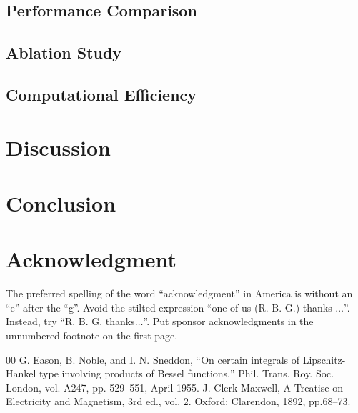 \documentclass[conference]{IEEEtran}
\begin{document}
\subsection{Performance Comparison}

\subsection{Ablation Study}

\subsection{Computational Efficiency}












\section{Discussion}










\section{Conclusion}









\section*{Acknowledgment}

The preferred spelling of the word ``acknowledgment'' in America is without 
an ``e'' after the ``g''. Avoid the stilted expression ``one of us (R. B. G.) 
thanks $\ldots$''. Instead, try ``R. B. G. thanks$\ldots$''. Put sponsor 
acknowledgments in the unnumbered footnote on the first page.

\begin{thebibliography}{00}
 G. Eason, B. Noble, and I. N. Sneddon, ``On certain integrals of Lipschitz-Hankel type involving products of Bessel functions,'' Phil. Trans. Roy. Soc. London, vol. A247, pp. 529--551, April 1955.
 J. Clerk Maxwell, A Treatise on Electricity and Magnetism, 3rd ed., vol. 2. Oxford: Clarendon, 1892, pp.68--73.
\end{thebibliography}
\end{document}
